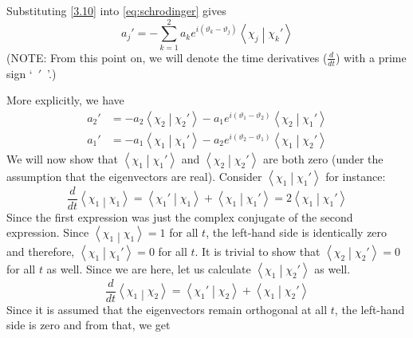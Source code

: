 \documentclass[12pt,a4paper]{article}
\begin{document}
	Substituting \eqref{3.10} into \eqref{eq:schrodinger} gives
	\begin{equation}
		a_{j}' = - \sum_{k = 1}^{2} a_{k} e^{i \left( \vartheta_{k}- \vartheta_{j}\right)} \left\langle \chi_{j} \middle| \chi_{k}' \right\rangle
		\label{3.13}
	\end{equation}
	(NOTE: From this point on, we will denote the time derivatives ($\frac{d}{dt}$) with a prime sign \newline \textquoteleft\ $'$\ \textquoteright.)
	
	More explicitly, we have
	\begin{align}
		a_{2}' &= - a_{2} \left\langle \chi_{2} \middle| \chi_{2}' \right\rangle - a_{1} e^{i \left( \vartheta_{1}- \vartheta_{2}\right)} \left\langle \chi_{2} \middle| \chi_{1}' \right\rangle \label{3.14} \\
		a_{1}' &= - a_{1} \left\langle \chi_{1} \middle| \chi_{1}' \right\rangle - a_{2} e^{i \left( \vartheta_{2}- \vartheta_{1}\right)} \left\langle \chi_{1} \middle| \chi_{2}' \right\rangle \label{3.15}
	\end{align} 
	We will now show that $\left\langle \chi_{1} \middle| \chi_{1}' \right\rangle$ and $\left\langle \chi_{2} \middle| \chi_{2}' \right\rangle$ are both zero (under the assumption that the eigenvectors are real). Consider $\left\langle \chi_{1} \middle| \chi_{1}' \right\rangle$ for instance:
	\begin{equation}
		\dfrac{d}{dt} \left\langle \chi_{1} \middle| \chi_{1} \right\rangle = \left\langle \chi_{1}' \middle| \chi_{1} \right\rangle + \left\langle \chi_{1} \middle| \chi_{1}' \right\rangle = 2 \left\langle \chi_{1} \middle| \chi_{1}' \right\rangle
	\end{equation}
	Since the first expression was just the complex conjugate of the second expression. Since $\left\langle \chi_{1} \middle| \chi_{1} \right\rangle = 1$ for all $t$, the left-hand side is identically zero and therefore, $\left\langle \chi_{1} \middle| \chi_{1}' \right\rangle = 0$ for all $t$. It is trivial to show that  $\left\langle \chi_{2} \middle| \chi_{2}' \right\rangle = 0$ for all $t$ as well. Since we are here, let us calculate $\left\langle \chi_{1} \middle| \chi_{2}' \right\rangle$ as well.
	\begin{equation}
		\dfrac{d}{dt} \left\langle \chi_{1} \middle| \chi_{2} \right\rangle = \left\langle \chi_{1}' \middle| \chi_{2} \right\rangle + \left\langle \chi_{1} \middle| \chi_{2}' \right\rangle 
	\end{equation}
	Since it is assumed that the eigenvectors remain orthogonal at all $t$, the left-hand side is zero and from that, we get
\end{document}
